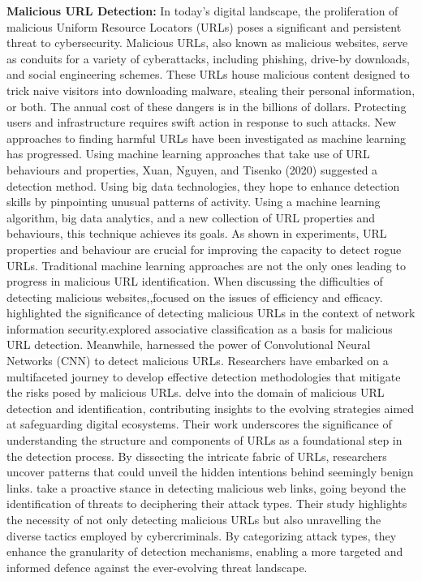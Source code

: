 \textbf{Malicious URL Detection:}
In today's digital landscape, the proliferation of malicious Uniform Resource Locators (URLs) poses a significant and persistent threat to cybersecurity. Malicious URLs, also known as malicious websites, serve as conduits for a variety of cyberattacks, including phishing, drive-by downloads, and social engineering schemes. These URLs house malicious content designed to trick naive visitors into downloading malware, stealing their personal information, or both. The annual cost of these dangers is in the billions of dollars. Protecting users and infrastructure requires swift action in response to such attacks.
New approaches to finding harmful URLs have been investigated as machine learning has progressed. Using machine learning approaches that take use of URL behaviours and properties,\cite{eshete2011malicious} Xuan, Nguyen, and Tisenko (2020) suggested a detection method. Using big data technologies, they hope to enhance detection skills by pinpointing unusual patterns of activity. Using a machine learning algorithm, big data analytics, and a new collection of URL properties and behaviours, this technique achieves its goals. As shown in experiments, URL properties and behaviour are crucial for improving the capacity to detect rogue URLs.
Traditional machine learning approaches are not the only ones leading to progress in malicious URL identification. When discussing the difficulties of detecting malicious websites,\cite{eshete2011malicious},focused on the issues of efficiency and efficacy.\cite{alkhudair2020detecting} highlighted the significance of detecting malicious URLs in the context of network information security.\cite{kumi2021malicious}explored associative classification as a basis for malicious URL detection. Meanwhile,\cite{abdi2017malicious} harnessed the power of Convolutional Neural Networks (CNN) to detect malicious URLs.
Researchers have embarked on a multifaceted journey to develop effective detection methodologies that mitigate the risks posed by malicious URLs. \cite{sayamber2014malicious}delve into the domain of malicious URL detection and identification, contributing insights to the evolving strategies aimed at safeguarding digital ecosystems. Their work underscores the significance of understanding the structure and components of URLs as a foundational step in the detection process. By dissecting the intricate fabric of URLs, researchers uncover patterns that could unveil the hidden intentions behind seemingly benign links.
\cite{choi2011detecting} take a proactive stance in detecting malicious web links, going beyond the identification of threats to deciphering their attack types. Their study highlights the necessity of not only detecting malicious URLs but also unravelling the diverse tactics employed by cybercriminals. By categorizing attack types, they enhance the granularity of detection mechanisms, enabling a more targeted and informed defence against the ever-evolving threat landscape.
